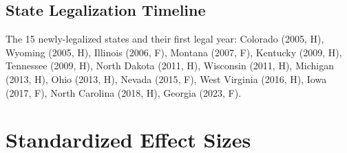 \documentclass[12pt]{article}
\begin{document}
\subsection{State Legalization Timeline}

The 15 newly-legalized states and their first legal year: Colorado (2005, H), Wyoming (2005, H), Illinois (2006, F), Montana (2007, F), Kentucky (2009, H), Tennessee (2009, H), North Dakota (2011, H), Wisconsin (2011, H), Michigan (2013, H), Ohio (2013, H), Nevada (2015, F), West Virginia (2016, H), Iowa (2017, F), North Carolina (2018, H), Georgia (2023, F).


\section{Standardized Effect Sizes}
\label{sec:sde}


\end{document}
